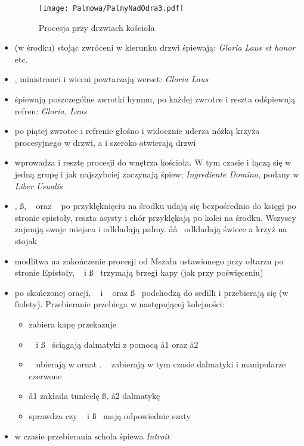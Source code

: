 \begin{itemize}
	      \begin{figure}[h]
		      \centering
		      \texttt{[image: Palmowa/PalmyNadOdra3.pdf]}
		      \caption{Procesja przy drzwiach kościoła}
		      \label{fig:procesja_palm}
	      \end{figure}

	\item {} (w środku) stojąc zwróceni w kierunku drzwi śpiewają:
	      \textit{Gloria Laus et honor} etc.
	\item {}, ministranci i wierni powtarzają werset: \textit{Gloria Laus}
	\item {} śpiewają poszczególne zwrotki hymnu, po każdej zwrotce
	       i reszta odśpiewują refren: \textit{Gloria, Laus}
	\item po piątej zwrotce i refrenie  głośno i widocznie uderza nóżką
	      krzyża procesyjnego w drzwi, a  i  szeroko otwierają drzwi
	\item {} wprowadza  i resztę procesji do wnętrza kościoła. W tym
	      czasie  i  łączą się w jedną grupę i jak najszybciej zaczynają
	      śpiew: \textit{Ingrediente Domino}, podany w
	      \textit{Liber Usualis}
	\item \dd, \ss, \ii~ oraz \cc~ po przyklęknięciu na środku udają się
	      bezpośrednio do księgi po stronie epistoły, reszta asysty i chór
	      przyklękają po kolei na środku. Wszyscy zajmują swoje miejsca i
	      odkładają palmy. \aa\aa~ odkładają świece a  krzyż na stojak
	\item modlitwa na zakończenie procesji od Mszału ustawionego przy ołtarzu po
	      stronie Epistoły, \dd~ i \ss~ trzymają brzegi kapy (jak przy poświęceniu)
	\item po skończonej oracji, \ii~ i \dd~ oraz \ss~ podchodzą do sedilli i
	      przebierają się (w {\color{violet}fiolety}). Przebieranie przebiega w
	      następującej kolejności:

	      \begin{itemize}
		      \item {} zabiera kapę przekazuje \zz
		      \item \dd~ i \ss~ ściągają dalmatyki z pomocą \aa1 oraz \aa2
		      \item \cc\cc~ ubierają w ornat \ii, \zz\zz~ zabierają w tym
		            czasie dalmatyki i manipularze czerwone
		      \item \aa1 zakłada tunicelę \ss, \aa2 dalmatykę \dd
		      \item {} sprawdza czy \dd~ i \ss~ mają odpowiednie szaty
	      \end{itemize}

	\item w czasie przebierania schola śpiewa \textit{Introit}
\end{itemize}